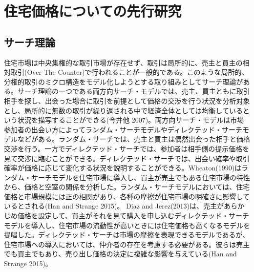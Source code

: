 \documentclass[a4paper,fontsize=11pt,report,notitlepage,line_length=38zw,number_of_lines=40,dvipdfmx]{jlreq}
\begin{document}
\section{住宅価格についての先行研究}
\subsection{サーチ理論}
住宅市場は中央集権的な取引市場が存在せず、取引は局所的に、売主と買主の相対取引(Over The Counter)で行われることが一般的である。このような局所的、分権的取引のミクロ構造をモデル化しようとする取り組みとしてサーチ理論がある。サーチ理論の一つである両方向サーチ・モデルでは、売主、買主ともに取引相手を探し、出会った場合に取引を前提として価格の交渉を行う状況を分析対象とし、局所的に無数の取引が繰り返される中で経済全体としては均衡しているという状況を描写することができる(今井他 2007)\cite{imai2007}。両方向サーチ・モデルは市場参加者の出会い方によってランダム・サーチモデルやディレクテッド・サーチモデルなどがある。ランダム・サーチでは、売主と買主は偶然出会った相手と価格交渉を行う。一方でディレクテッド・サーチでは、参加者は相手側の提示価格を見て交渉に臨むことができる。ディレクテッド・サーチでは、出会い確率や取引確率が価格に応じて変化する状況を説明することができる。Wheaton(1990)\cite{wheaton1990}はランダム・サーチモデルを住宅市場に導入し、買主が売主でもある住宅市場の特性から、価格と空室の関係を分析した。ランダム・サーチモデルにおいては、住宅価格と市場規模には正の相関があり、各種の摩擦が住宅市場の明確さに影響しているとされる(Han and Strange 2015)\cite{han2015}。
Diaz and Jerez(2013)\cite{diaz2013}は、売主があらかじめ価格を設定して、買主がそれを見て購入を申し込むディレクテッド・サーチモデルを導入し、住宅市場の流動性が高いときには住宅価格も高くなるモデルを提唱した。ディレクテッド・サーチは市場の摩擦を表現できるモデルであるが、住宅市場への導入においては、仲介者の存在を考慮する必要がある。彼らは売主でも買主でもあり、売り出し価格の決定に複雑な影響を与えている(Han and Strange  2015)\cite{han2015}。
\end{document}

